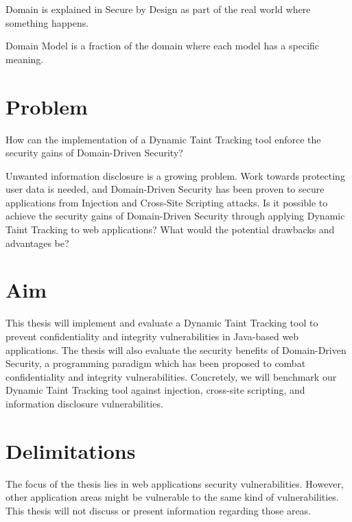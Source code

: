 \begin{definition}{Domain}
    is explained in Secure by Design \parencite{sbd2018} as part of the real world where something happens.
    \\
\end{definition}

\begin{definition}{Domain Model}
    is a fraction of the domain where each model has a specific meaning.
    \\
\end{definition}



\section{Problem}
\label{Problem}
\begin{chapquote}{}
    How can the implementation of a Dynamic Taint Tracking tool enforce the security gains of Domain-Driven Security?
\end{chapquote}

\noindent
Unwanted information disclosure is a growing problem. Work towards protecting user data is needed, and Domain-Driven Security has been proven to secure applications from Injection and Cross-Site Scripting attacks. Is it possible to achieve the security gains of Domain-Driven Security through applying Dynamic Taint Tracking to web applications? What would the potential drawbacks and advantages be?



\section{Aim}
\label{Aim}
This thesis will implement and evaluate a Dynamic Taint Tracking tool to prevent confidentiality and integrity vulnerabilities in Java-based web applications. The thesis will also evaluate the security benefits of Domain-Driven Security, a programming paradigm which has been proposed to combat confidentiality and integrity vulnerabilities. Concretely, we will benchmark our Dynamic Taint Tracking tool against injection, cross-site scripting, and information disclosure vulnerabilities.



\section{Delimitations}
\label{Delimitations}
The focus of the thesis lies in web applications security vulnerabilities. However, other application areas might be vulnerable to the same kind of vulnerabilities.  This thesis will not discuss or present information regarding those areas.

